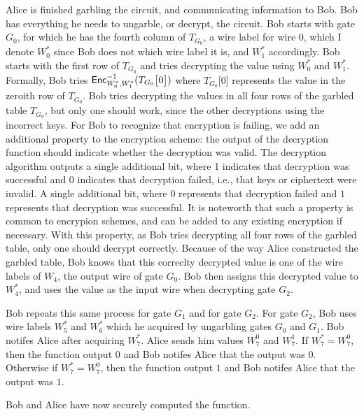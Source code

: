 Alice is finished garbling the circuit, and communicating information to Bob. 
Bob has everything he needs to ungarble, or decrypt, the circuit.
Bob starts with gate $G_0$, for which he has the fourth column of $T_{G_0}$, a wire label for wire $0$, which I denote $W_0^*$ since Bob does not which wire label it is, and $W_1^*$ accordingly.
Bob starts with the first row of $T_{G_0}$ and tries decrypting the value using $W_0^*$ and $W_1^*$.
Formally, Bob tries $\textsf{Enc}^{-1}_{W_0^*, W_1^*}(T_{G_0}\big[0\big])$ where $T_{G_0}\big[0\big]$ represents the value in the zeroith row of $T_{G_0}$.
Bob tries decrypting the values in all four rows of the garbled table $T_{G_0}$, but only one should work, since the other decryptions using the incorrect keys.
For Bob to recognize that encryption is failing, we add an additional property to the encryption scheme: the output of the decryption function should indicate whether the decryption was valid.
The decryption algorithm outputs a single additional bit, where 1 indicates that decryption was successful and 0 indicates that decryption failed, i.e., that keys or ciphertext were invalid.
A single additional bit, where $0$ represents that decryption failed and $1$ represents that decryption was successful. 
It is noteworth that such a property is common to encrypion schemes, and can be added to any existing encryption if necessary.
With this property, as Bob tries decrypting all four rows of the garbled table, only one should decrypt correctly.
Because of the way Alice constructed the garbled table, Bob knows that this correclty decrypted value is one of the wire labels of $W_4$, the output wire of gate $G_0$.
Bob then assigns this decrypted value to $W_4^*$, and uses the value as the input wire when decrypting gate $G_2$.

Bob repeats this same process for gate $G_1$ and for gate $G_2$.
For gate $G_2$, Bob uses wire labels $W_5^*$ and $W_6^*$ which he acquired by ungarbling gates $G_0$ and $G_1$.
Bob notifes Alice after acquiring $W_7^*$.
Alice sends him values $W_7^0$ and $W_7^1$.
If $W_7^* = W_7^0$, then the function output $0$ and Bob notifes Alice that the output was $0$.
Otherwise if $W_7^* = W_7^0$, then the function output $1$ and Bob notifes Alice that the output was $1$.

Bob and Alice have now securely computed the function.


